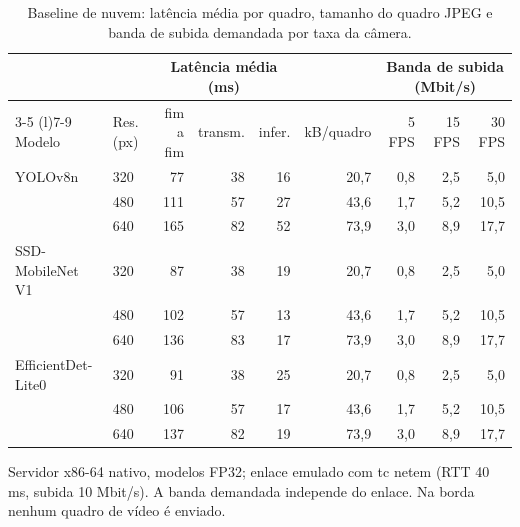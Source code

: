\begin{table}[t]
\centering
\footnotesize
\caption{Baseline de nuvem: latência média por quadro, tamanho do quadro JPEG e banda de subida demandada por taxa da câmera.}
\label{tab:nuvem}
\setlength{\tabcolsep}{4pt}
\begin{tabular}{@{}llrrrr*{3}{r}@{}}
\toprule
& & \multicolumn{3}{c}{Latência média (ms)} & & \multicolumn{3}{c}{Banda de subida (Mbit/s)} \\ \cmidrule(lr){3-5} \cmidrule(l){7-9}
Modelo & {Res. (px)} & {fim a fim} & {transm.} & {infer.} & {kB/quadro} & {5 FPS} & {15 FPS} & {30 FPS} \\
\midrule
YOLOv8n & 320 & 77 & 38 & 16 & 20,7 & 0,8 & 2,5 & 5,0 \\
 & 480 & 111 & 57 & 27 & 43,6 & 1,7 & 5,2 & 10,5 \\
 & 640 & 165 & 82 & 52 & 73,9 & 3,0 & 8,9 & 17,7 \\
SSD-MobileNet V1 & 320 & 87 & 38 & 19 & 20,7 & 0,8 & 2,5 & 5,0 \\
 & 480 & 102 & 57 & 13 & 43,6 & 1,7 & 5,2 & 10,5 \\
 & 640 & 136 & 83 & 17 & 73,9 & 3,0 & 8,9 & 17,7 \\
EfficientDet-Lite0 & 320 & 91 & 38 & 25 & 20,7 & 0,8 & 2,5 & 5,0 \\
 & 480 & 106 & 57 & 17 & 43,6 & 1,7 & 5,2 & 10,5 \\
 & 640 & 137 & 82 & 19 & 73,9 & 3,0 & 8,9 & 17,7 \\
\bottomrule
\end{tabular}
\par\smallskip
\parbox{0.96\linewidth}{\scriptsize Servidor x86-64 nativo, modelos FP32; enlace emulado com tc netem (RTT 40 ms, subida 10 Mbit/s). A banda demandada independe do enlace. Na borda nenhum quadro de vídeo é enviado.}
\end{table}
